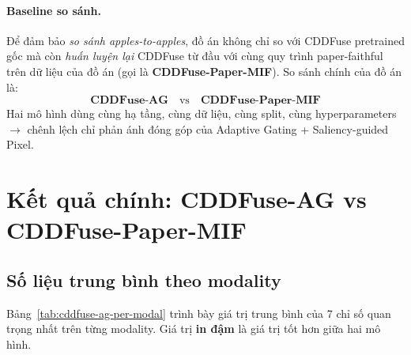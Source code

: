 \paragraph{Baseline so sánh.}
Để đảm bảo \emph{so sánh apples-to-apples}, đồ án không chỉ so với CDDFuse pretrained gốc mà còn \emph{huấn luyện lại} CDDFuse từ đầu với cùng quy trình paper-faithful trên dữ liệu của đồ án (gọi là \textbf{CDDFuse-Paper-MIF}). So sánh chính của đồ án là:
\begin{equation*}
\boxed{\textbf{CDDFuse-AG} \quad \text{vs} \quad \textbf{CDDFuse-Paper-MIF}}
\end{equation*}
Hai mô hình dùng cùng hạ tầng, cùng dữ liệu, cùng split, cùng hyperparameters $\to$ chênh lệch chỉ phản ánh đóng góp của Adaptive Gating + Saliency-guided Pixel.

\section{Kết quả chính: CDDFuse-AG vs CDDFuse-Paper-MIF}
\label{sec:results-main}

\subsection{Số liệu trung bình theo modality}
\label{ssec:per-modal-numbers}

Bảng~\ref{tab:cddfuse-ag-per-modal} trình bày giá trị trung bình của 7 chỉ số quan trọng nhất trên từng modality. Giá trị \textbf{in đậm} là giá trị tốt hơn giữa hai mô hình.

